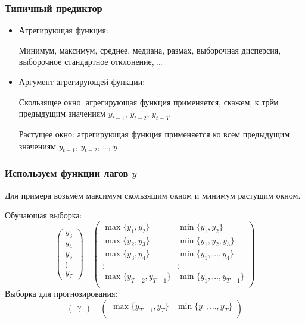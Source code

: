 \begin{frame}
  \frametitle{Типичный предиктор}

  \begin{itemize}[<+->]
    \item \alert{Агрегирующая функция}:
    
    Минимум, максимум, среднее, медиана, размах, выборочная дисперсия, выборочное стандартное отклонение, \ldots

    \item \alert{Аргумент} агрегирующей функции:
    
    \alert{Скользящее окно}: агрегирующая функция применяется, скажем, к трём предыдущим значениям $y_{t-1}$, $y_{t-2}$, $y_{t-3}$.

    \alert{Растущее окно}: агрегирующая функция применяется ко всем предыдущим значениям $y_{t-1}$, $y_{t-2}$, \ldots,  $y_{1}$.
  \end{itemize}

\end{frame}


\begin{frame}
  \frametitle{Используем функции лагов $y$}

  Для примера возьмём максимум скользящим окном и минимум растущим окном. 
  \pause

  \alert{Обучающая} выборка:
  \[
  \begin{pmatrix}
    y_3 \\
    y_4 \\
    y_5 \\
    \vdots \\
    y_T 
  \end{pmatrix}  \quad 
  \begin{pmatrix}
    \max\{y_1, y_2\} & \min\{y_1, y_2\} \\
    \max\{y_2, y_3\} & \min\{y_1, y_2, y_3\} \\
    \max\{y_3, y_4\} & \min\{y_1, \ldots, y_4\} \\
    \vdots & \vdots \\
    \max\{y_{T-2}, y_{T-1}\} & \min\{y_1, \ldots, y_{T-1}\} \\
  \end{pmatrix}
  \]
  \pause
  Выборка для \alert{прогнозирования}:
  \[
  \begin{pmatrix}
    ? 
  \end{pmatrix}  \quad 
  \begin{pmatrix}
    \max\{y_{T-1}, y_{T}\} & \min\{y_1, \ldots, y_{T}\} \\
  \end{pmatrix}
  \]
  
\end{frame}



